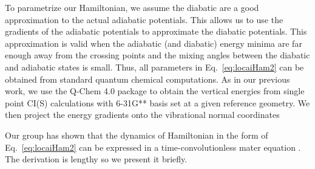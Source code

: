 To parametrize our Hamiltonian, we assume the diabatic
are a good approximation to the actual adiabatic potentials.
This allows us to
use the gradients of the adiabatic potentials to approximate the diabatic potentials.
This approximation is  valid when the adiabatic (and diabatic) energy minima
are far enough away from the crossing points and the mixing angles between the diabatic  and adiabatic
states is small.
Thus, all parameters in Eq.~\ref{eq:locaiHam2}  can be  obtained from
standard  quantum chemical computations.
As in our previous work, we use the Q-Chem 4.0 package  to obtain the vertical energies
 from single point CI(S) calculations with 6-31G** basis set at a given
reference geometry.   We then project the energy gradients onto the vibrational normal
coordinates

Our group has shown that the dynamics of Hamiltonian in the form of Eq.~\ref{eq:locaiHam2} can be expressed in a time-convolutionless mater equation \cite{pereverzev2006time}. The derivation is lengthy so we present it briefly.

